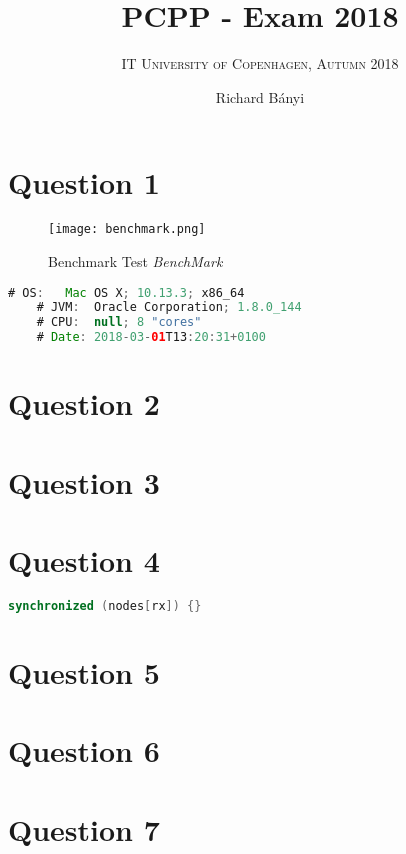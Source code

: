 \documentclass[format=acmsmall, review=false, screen=true]{acmart}
\author{Richard Bányi}
\title{\textsc{PCPP} - Exam 2018}
\subtitle{\textsc{IT University of Copenhagen, Autumn 2018}}
\begin{document}
\maketitle

\section{Question 1}

\begin{figure}[H]
  \texttt{[image: benchmark.png]}
  \caption{Benchmark Test \textit{BenchMark}}
  \label{fig:benchmark}
\end{figure}


\begin{lstlisting}[language=java]
	# OS:   Mac OS X; 10.13.3; x86_64
	# JVM:  Oracle Corporation; 1.8.0_144
	# CPU:  null; 8 "cores"
	# Date: 2018-03-01T13:20:31+0100
\end{lstlisting}


\section{Question 2}

\section{Question 3}

\section{Question 4}


\begin{lstlisting}[language=java]
synchronized (nodes[rx]) {}
\end{lstlisting}

\section{Question 5}

\section{Question 6}


\section{Question 7}
\end{document}
